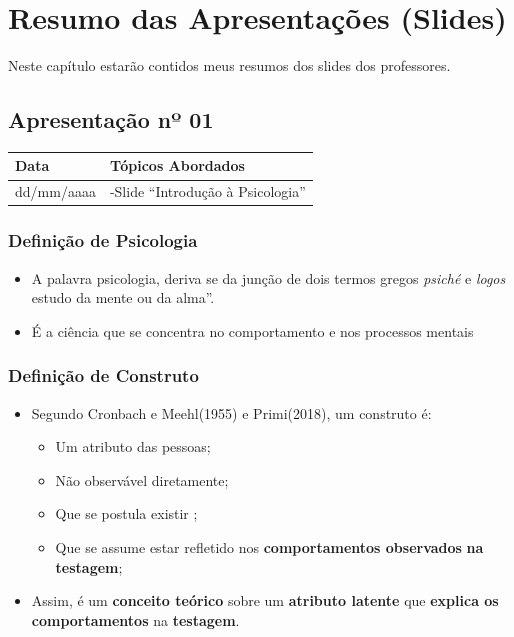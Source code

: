 \documentclass[
]{book}
\providecommand{\tightlist}{%
  \setlength{\itemsep}{0pt}\setlength{\parskip}{0pt}}
\begin{document}
\hypertarget{resumo-das-apresentauxe7uxf5es-slides-1}{%
\chapter{Resumo das Apresentações (Slides)}\label{resumo-das-apresentauxe7uxf5es-slides-1}}

Neste capítulo estarão contidos meus resumos dos slides dos professores.

\hypertarget{apresentauxe7uxe3o-nuxba-01-1}{%
\section{Apresentação nº 01}\label{apresentauxe7uxe3o-nuxba-01-1}}

\begin{longtable}[]{@{}ll@{}}
\toprule()
Data & Tópicos Abordados \\
\midrule()
\endhead
dd/mm/aaaa & -Slide ``Introdução à Psicologia'' \\
\bottomrule()
\end{longtable}

\hypertarget{definiuxe7uxe3o-de-psicologia-1}{%
\subsection{Definição de Psicologia}\label{definiuxe7uxe3o-de-psicologia-1}}

\begin{itemize}
\tightlist
\item
  A palavra psicologia, deriva se da junção de dois termos gregos \emph{psiché} e \emph{logos} estudo da mente ou da alma''.
\item
  É a ciência que se concentra no comportamento e nos processos mentais
\end{itemize}

\hypertarget{definiuxe7uxe3o-de-construto-1}{%
\subsection{Definição de Construto}\label{definiuxe7uxe3o-de-construto-1}}

\begin{itemize}
\tightlist
\item
  Segundo Cronbach e Meehl(1955) e Primi(2018), um construto é:

  \begin{itemize}
  \tightlist
  \item
    Um atributo das pessoas;
  \item
    Não observável diretamente;
  \item
    Que se postula existir ;
  \item
    Que se assume estar refletido nos \textbf{comportamentos observados} \textbf{na testagem};
  \end{itemize}
\item
  Assim, é um \textbf{conceito teórico} sobre um \textbf{atributo latente} que \textbf{explica os comportamentos} na \textbf{testagem}.
\end{itemize}
\end{document}
